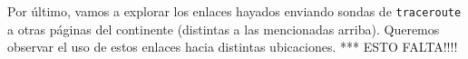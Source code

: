 Por \'ultimo, vamos a explorar los enlaces hayados enviando sondas de \texttt{traceroute} a otras p\'aginas del continente (distintas a las mencionadas arriba). Queremos observar el uso de estos enlaces hacia distintas ubicaciones. *** ESTO FALTA!!!!

 
